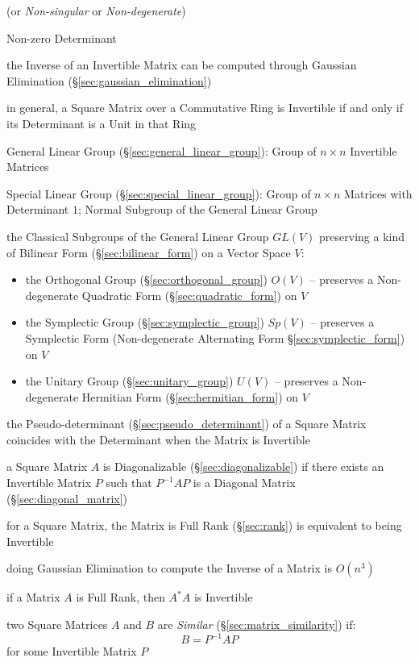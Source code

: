 (or \emph{Non-singular} or \emph{Non-degenerate})

Non-zero Determinant

\fist the Inverse of an Invertible Matrix can be computed through Gaussian
Elimination (\S\ref{sec:gaussian_elimination})

in general, a Square Matrix over a Commutative Ring is Invertible if and only
if its Determinant is a Unit in that Ring

\fist General Linear Group (\S\ref{sec:general_linear_group}): Group of $n
\times n$ Invertible Matrices

\fist Special Linear Group (\S\ref{sec:special_linear_group}): Group of $n
\times n$ Matrices with Determinant $1$; Normal Subgroup of the General Linear
Group

the Classical Subgroups of the General Linear Group $GL(V)$ preserving a kind
of Bilinear Form (\S\ref{sec:bilinear_form}) on a Vector Space $V$:
\begin{itemize}
  \item the Orthogonal Group (\S\ref{sec:orthogonal_group}) $O(V)$ -- preserves
    a Non-degenerate Quadratic Form (\S\ref{sec:quadratic_form}) on $V$
  \item the Symplectic Group (\S\ref{sec:symplectic_group}) $Sp(V)$
    -- preserves a Symplectic Form (Non-degenerate Alternating Form
    \S\ref{sec:symplectic_form}) on $V$
  \item the Unitary Group (\S\ref{sec:unitary_group}) $U(V)$
    -- preserves a Non-degenerate Hermitian Form (\S\ref{sec:hermitian_form})
    on $V$
\end{itemize}

the Pseudo-determinant (\S\ref{sec:pseudo_determinant}) of a Square Matrix
coincides with the Determinant when the Matrix is Invertible

a Square Matrix $A$ is Diagonalizable (\S\ref{sec:diagonalizable}) if there
exists an Invertible Matrix $P$ such that $P^{-1}AP$ is a Diagonal Matrix
(\S\ref{sec:diagonal_matrix})

for a Square Matrix, the Matrix is Full Rank (\S\ref{sec:rank}) is
equivalent to being Invertible

doing Gaussian Elimination to compute the Inverse of a Matrix is $O(n^3)$

if a Matrix $A$ is Full Rank, then $A^*A$ is Invertible

two Square Matrices $A$ and $B$ are \emph{Similar}
(\S\ref{sec:matrix_similarity}) if:
\[
  B = P^{-1}AP
\]
for some Invertible Matrix $P$



